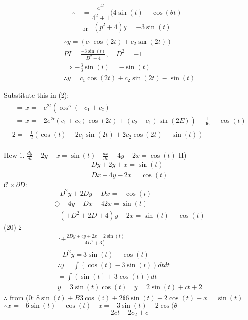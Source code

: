 \documentclass[12pt, a4paper]{article}
\begin{document}
$$
\therefore \quad=\frac{e^{4 t}}{4^2+1}(4 \sin(t)-\cos(\theta t)
$$
$$
\text{ or } \begin{aligned}
	\left(p^2+4\right) y=-3 \sin(t) \\
\end{aligned}
$$
$$
\begin{aligned}
	 & \therefore y=\left(c_1 \cos(2 t)+c_2 \sin(2 t)\right) \\
	 & P I=\frac{-3 \sin(t)}{D^2+4}, \quad D^2=-1            \\
	 & \Rightarrow-\frac{3}{3} \sin(t)=-\sin(t)              \\
	 & \therefore y=c_1 \cos(2 t)+c_2 \sin(2 t)-\sin(t)
\end{aligned}
$$

	Substitute this in (2):
$$
\begin{aligned}
	 & \begin{array}{l}
		   \Rightarrow x=-e^{2 t}\left(\cos ^5\left(-c_1+c_2\right)\right. \\
		   \left.\Rightarrow x=-2 e^{2 t}\left(c_1+c_2\right) \cos(2 t)+\left(c_2-c_1\right) \sin(2 E)\right)-\frac{1}{16}-\cos(t)
	   \end{array} \\
	 & 2=-\frac{1}{2}\left(\cos(t)-2 c_1 \sin(2 t)+2 c_2 \cos(2 t)-\sin(t)\right)                                                                               \\
	 &
\end{aligned}
$$

	Hew
	1. $\frac{d y}{d t}+2 y+x=\sin(t) \quad \frac{d x}{d t}-4 y-2 x=\cos(t)$
	H)
$$
\begin{aligned}
	 & D y+2 y+x=\sin(t)   \\
	 & D x-4 y-2 x=\cos(t)
\end{aligned}
$$
	$\mathcal{C} \times \bar{\partial} D:$
$$
\begin{aligned}
	 & -D^2 y+2 D y-D x=-\cos(t)                      \\
	 & \oplus-4 y+D x-42 x=\sin(t)                    \\
	 & -\left(+D^2+2 D+4\right) y-2 x=\sin(t)-\cos(t)
\end{aligned}
$$
	(20) 2
$$
\begin{aligned}
	 & \therefore+\frac{2 D y+4 y+2 x=2 \sin(t)}{\left.4 D^2+3\right)} \\
	 & -D^2 y=3 \sin(t)-\cos(t)                                        \\
	 & \therefore y=\int(\cos(t)-3 \sin(t)) d t d t                    \\
	 & =\int(\sin(t)+3 \cos(t)) d t                                    \\
	 & y=3 \sin(t) \cos(t) \quad y=2 \sin(t)+c t+2
\end{aligned}
$$
	$\therefore$ from (0:
	$8 \sin(t)+B 3 \cos(t)+266 \sin(t)-2 \cos(t)+x=\sin(t)$
	$\therefore x=-6 \sin(t)-\cos(t) \quad x=-3 \sin(t)-2 \cos(\theta$
$$
-2 c t+2 c_2+c
$$
\end{document}
